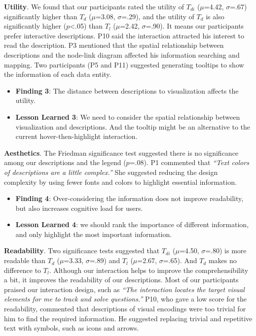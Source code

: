 \textbf{Utility}.
We found that our participants rated the utility of $T_{di}$ ($\mu$=4.42, $\sigma$=.67) significantly higher than $T_d$ ($\mu$=3.08, $\sigma$=.29), and the utility of $T_d$ is also significantly higher ($p$<.05) than $T_l$ ($\mu$=2.42, $\sigma$=.90).
It means our participants prefer interactive descriptions.
P10 said the interaction attracted his interest to read the description.
P3 mentioned that the spatial relationship between descriptions and the node-link diagram affected his information searching and mapping.
Two participants (P5 and P11) suggested generating tooltips to show the information of each data entity.

\begin{itemize}[noitemsep,topsep=0pt,parsep=0pt,partopsep=0pt, leftmargin=20pt]
    \item {\bf Finding 3}: The distance between descriptions to visualization affects the utility.
    \item {\bf Lesson Learned 3}: We need to consider the spatial relationship between visualization and descriptions. And the tooltip might be an alternative to the current hover-then-highlight interaction.
\end{itemize}

\textbf{Aesthetics}.
The Friedman significance test suggested there is no significance among our descriptions and the legend ($p$=.08).
P1 commented that \textit{``Text colors of descriptions are a little complex.''} She suggested reducing the design complexity by using fewer fonts and colors to highlight essential information.

\begin{itemize}[noitemsep,topsep=0pt,parsep=0pt,partopsep=0pt, leftmargin=20pt]
    \item {\bf Finding 4}: Over-considering the information does not improve readability, but also increases cognitive load for users.
    \item {\bf Lesson Learned 4}: we should rank the importance of different information, and only highlight the most important information.
\end{itemize}

\textbf{Readability}.
Two significance tests suggested that $T_{di}$ ($\mu$=4.50, $\sigma$=.80) is more readable than $T_d$ ($\mu$=3.33, $\sigma$=.89) and $T_l$ ($\mu$=2.67, $\sigma$=.65). And $T_d$ makes no difference to $T_l$.
Although our interaction helps to improve the comprehensibility a bit, it improves the readability of our descriptions.
Most of our participants praised our interaction design, such as \textit{``The interaction locates the target visual elements for me to track and solve questions.''} 
P10, who gave a low score for the readability, commented that descriptions of visual encodings were too trivial for him to find the required information. 
He suggested replacing trivial and repetitive text with symbols, such as icons and arrows.
 

